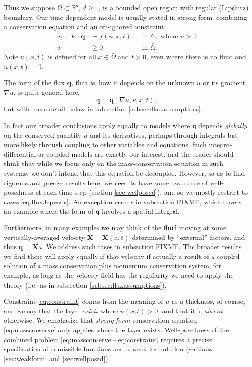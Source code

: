 \documentclass[final,leqno,onefignum,onetabnum]{siamltex1213bueler}
\newcommand\bq{\mathbf{q}}
\newcommand\bX{\mathbf{X}}
\newcommand{\Div}{\nabla\cdot}
\renewcommand{\grad}{\nabla}
\newcommand\RR{\mathbb{R}}
\begin{document}
Thus we suppose $\Omega \subset \RR^d$, $d\ge 1$, is a bounded open region with regular (Lipshitz) boundary.  Our time-dependent model is usually stated in strong form, combining a conservation equation and an oft-ignored constraint:
\begin{align}
u_t + \Div \bq &= f(u,x,t) &&\text{in } \Omega, \text{ where } u > 0 \label{eq:massconserve} \\
u &\ge 0 &&\text{in } \bar\Omega. \label{eq:constraint}
\end{align}
Note $u(x,t)$ is defined for all $x\in \bar\Omega$ and $t>0$, even where there is no fluid and $u(x,t)=0$.

The form of the flux $\bq$, that is, how it depends on the unknown $u$ or its gradient $\grad u$, is quite general here,
\begin{equation}
\bq = \bq(\grad u,u,x,t), \label{eq:fluxdepends}
\end{equation}
but with more detail below in subsection \ref{subsec:fluxassumptions}.

In fact our broader conclusions apply equally to models where $\bq$ depends \emph{globally} on the conserved quantity $u$ and its derivatives, perhaps through integrals but more likely through coupling to other variables and equations.  Such integro-differential or coupled models are exactly our interest, and the reader should think that while we focus only on the mass-conservation equation in such systems, we don't intend that this equation be decoupled.  However, so as to find rigorous and precise results here, we need to have some assurance of well-posedness at each time step (section \ref{sec:wellposed}), and so we mostly restrict to cases \eqref{eq:fluxdepends}.  An exception occurs in subsection FIXME, which covers an example where the form of $\bq$ involves a spatial integral.

Furthermore, in many examples we may think of the fluid moving at some vertically-averaged velocity $\bX=\bX(x,t)$ determined by ``external'' factors, and thus $\bq = \bX u$.  We address such cases in subsection FIXME.  The broader results we find there will apply equally if that velocity if actually a result of a coupled solution of a mass conservation plus momentum conservation system, for example, as long as the velocity field has the regularity we need to apply the theory (i.e.~as in subsection \ref{subsec:fluxassumptions}).

Constraint \eqref{eq:constraint} comes from the meaning of $u$ as a thickness, of course, and we say that the layer \emph{exists} where $u(x,t)>0$, and that it is \emph{absent} otherwise.  We emphasize that \emph{strong form} conservation equation \eqref{eq:massconserve} only applies where the layer exists.  Well-posedness of the combined problem \eqref{eq:massconserve}--\eqref{eq:constraint} requires a precise specification of admissible functions and a weak formulation (sections \ref{sec:weakform} and \ref{sec:wellposed}).
\end{document}
